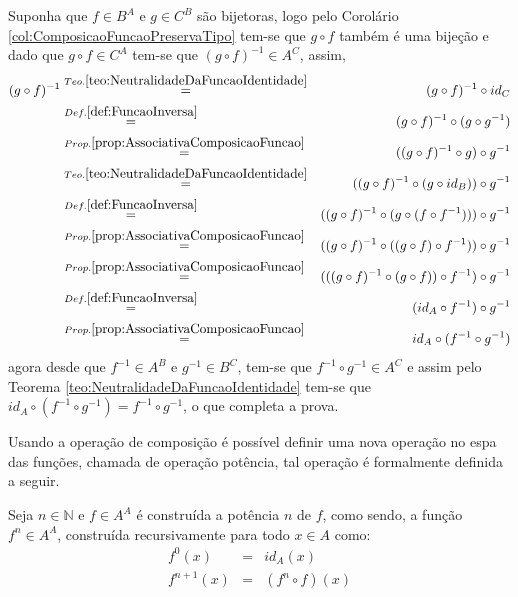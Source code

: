 \begin{prova}
	Suponha que $f \in B^A$ e $g \in C^B$ são bijetoras, logo pelo Corolário \ref{col:ComposicaoFuncaoPreservaTipo} tem-se que $g \circ f$ também é uma bijeção e dado que $g \circ f \in C^A$ tem-se que $(g \circ f)^{-1} \in A^C$, assim,
	\begin{eqnarray*}
		(g \circ f)^{-1} & \stackrel{Teo. \ref{teo:NeutralidadeDaFuncaoIdentidade}}{=} &  (g \circ f)^{-1} \circ id_C\\
		& \stackrel{Def. \ref{def:FuncaoInversa}}{=} & (g \circ f)^{-1} \circ (g \circ g^{-1})\\
		& \stackrel{Prop. \ref{prop:AssociativaComposicaoFuncao}}{=} & ((g \circ f)^{-1} \circ g) \circ g^{-1}\\
		& \stackrel{Teo. \ref{teo:NeutralidadeDaFuncaoIdentidade}}{=} & ((g \circ f)^{-1} \circ (g \circ id_B)) \circ g^{-1}\\
		& \stackrel{Def. \ref{def:FuncaoInversa}}{=} & ((g \circ f)^{-1} \circ (g \circ (f \circ f^{-1}))) \circ g^{-1}\\
		& \stackrel{Prop. \ref{prop:AssociativaComposicaoFuncao}}{=} & ((g \circ f)^{-1} \circ ((g \circ f) \circ f^{-1})) \circ g^{-1}\\
		& \stackrel{Prop. \ref{prop:AssociativaComposicaoFuncao}}{=} & (((g \circ f)^{-1} \circ (g \circ f)) \circ f^{-1}) \circ g^{-1}\\
		& \stackrel{Def. \ref{def:FuncaoInversa}}{=} & (id_A \circ f^{-1}) \circ g^{-1}\\
		& \stackrel{Prop. \ref{prop:AssociativaComposicaoFuncao}}{=} & id_A \circ (f^{-1} \circ g^{-1})
	\end{eqnarray*}
	agora desde que $f^{-1} \in A^B$ e $g^{-1} \in B^C$, tem-se que $f^{-1} \circ g^{-1} \in A^C$ e assim pelo Teorema \ref{teo:NeutralidadeDaFuncaoIdentidade} tem-se que $id_A \circ (f^{-1} \circ g^{-1}) = f^{-1} \circ g^{-1}$, o que completa a prova.
\end{prova}

Usando a operação de composição é possível definir uma nova operação no espa das funções, chamada de operação potência, tal operação é formalmente definida a seguir.

\begin{definicao}\label{def:PotenciaFuncao}
	Seja $n \in \mathbb{N}$ e  $f \in A^A$  é construída a potência $n$ de $f$, como sendo, a função $f^n \in A^A$, construída recursivamente para todo $x \in A$ como:
	\begin{eqnarray}
		f^0(x) & = & id_A(x)\\
		f^{n+1}(x) & = & (f^n \circ f)(x)
	\end{eqnarray}
\end{definicao}

